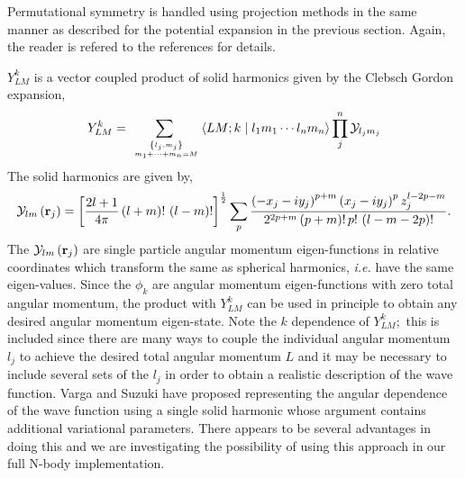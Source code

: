 Permutational symmetry is handled using projection methods in the same
manner as described for the potential expansion in the previous section.
Again, the reader is refered to the references for details\cite
{Poshusta83,Kinghorn93,Kinghorn95b}.

$Y_{LM}^k$ is a vector coupled product of solid harmonics\cite{Biedenharn81}
given by the Clebsch Gordon expansion, 
\begin{equation}
Y_{LM}^k=\sum_{\,\,%
{\left\{ l_j,m_j\right\}  \atopwithdelims.. m_1+\cdots +m_n=M}%
}\left\langle LM;k\right. |\left. l_1m_1\cdots l_nm_n\right\rangle \prod_j^n%
{\cal Y}_{l_jm_j}
\end{equation}
The solid harmonics are given by, 
\begin{equation}
{\cal Y}_{lm}\left( {\bf r}_j\right) =\left[ \frac{2l+1}{4\pi }\left(
l+m\right) !\,\left( l-m\right) !\right] ^{\frac 12}\sum_p\frac{\left(
-x_j-iy_j\right) ^{p+m}\left( x_j-iy_j\right) ^pz_j^{l-2p-m}}{2^{2p+m}\left(
p+m\right) !\,p!\,\left( l-m-2p\right) !}.
\end{equation}
The ${\cal Y}_{lm}\left( {\bf r}_j\right) $ are single particle angular
momentum eigen-functions in relative coordinates which transform the same as
spherical harmonics, {\it i.e.} have the same eigen-values. Since the $\phi
_k$ are angular momentum eigen-functions with zero total angular momentum,
the product with $Y_{LM}^k$ can be used in principle to obtain any desired
angular momentum eigen-state. Note the $k$ dependence of $Y_{LM}^k;$ this is
included since there are many ways to couple the individual angular momentum 
$l_j$ to achieve the desired total angular momentum $L$ and it may be
necessary to include several sets of the $l_j$ in order to obtain a
realistic description of the wave function. Varga and Suzuki\cite{Varga95}
have proposed representing the angular dependence of the wave function using
a single solid harmonic whose argument contains additional variational
parameters. There appears to be several advantages in doing this and we are
investigating the possibility of using this approach in our full N-body
implementation.

